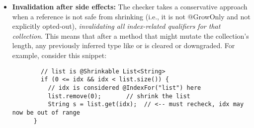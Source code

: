 \begin{itemize}
\item
  \textbf{Invalidation after side effects:}
    The checker takes a conservative approach when a reference is not safe from shrinking
    (i.e., it is not @GrowOnly and not explicitly opted-out), \emph{invalidating all
    index-related qualifiers for that collection}. This means that after a method that might
    mutate the collection's length, any previously inferred type like 
    or  is cleared or downgraded. For example, consider this snippet:

      \begin{Verbatim}
        // list is @Shrinkable List<String>
        if (0 <= idx && idx < list.size()) {
          // idx is considered @IndexFor("list") here
          list.remove(0);       // shrink the list
          String s = list.get(idx);  // <-- must recheck, idx may now be out of range
      }
      \end{Verbatim}


\end{itemize}
